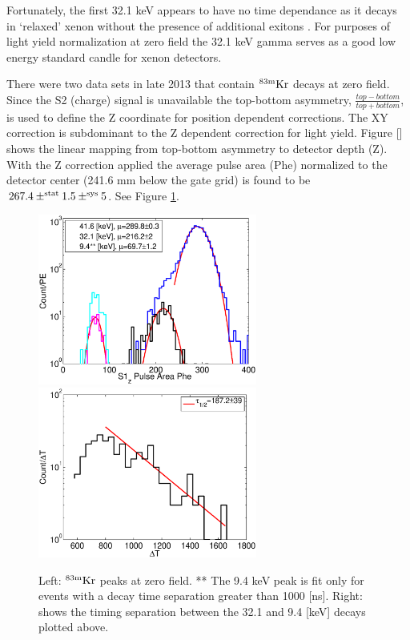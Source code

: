 Fortunately, the first 32.1 keV appears to have no time dependance as it decays in `relaxed' xenon without the presence of additional exitons \cite{Aprile_LY}. For purposes of light yield normalization at zero field the 32.1 keV gamma serves as a good low energy standard candle for xenon detectors.

There were two data sets in late 2013 that contain $\rm^{83m}Kr$ decays at zero field. Since the S2 (charge) signal is unavailable the top-bottom asymmetry, $\frac{top-bottom}{top+bottom} $, is used to define the Z coordinate for position dependent corrections. The XY correction is subdominant to the Z dependent correction for light yield. Figure [] shows the linear mapping from top-bottom asymmetry to detector depth (Z). With the Z correction applied the average pulse area (Phe) normalized to the detector center (241.6 mm below the gate grid) is found to be $\rm 267.4 \pm^{stat} 1.5 \pm^{sys} 5$. See Figure \ref{fig:ZeroField_Kr}.

 
 \begin{figure}[h!]\centering
\includegraphics[width=72mm]{Chapter_Flucs/Figures/S1_Z_no_field_lux10_20131009T1358_cp09670} %
\includegraphics[width=72mm]{Chapter_Flucs/Figures/dT_no_field_2lux10_20131009T1358_cp09670}
\caption{Left: $\rm^{83m}Kr$ peaks at zero field. ** The 9.4 keV peak is fit only for events with a decay time separation greater than 1000 [ns]. Right: shows the timing separation between the 32.1 and 9.4 [keV] decays plotted above.}
\label{fig:ZeroField_Kr}
\end{figure}
 
